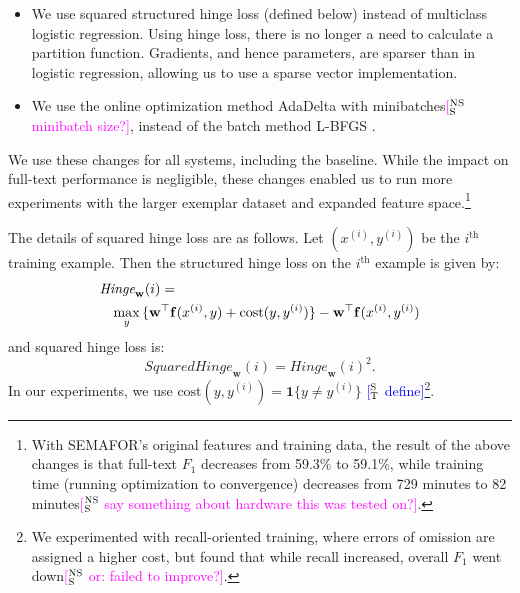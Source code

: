 \documentclass[11pt,a4paper]{article}
\newcommand{\indicator}[1]{\boldsymbol{1}\{#1\}}
\newcommand{\ensuretext}[1]{#1}
\newcommand{\nssmarker}{\ensuretext{\textcolor{magenta}{\ensuremath{^{\textsc{NS}}_{\textsc{S}}}}}}
\newcommand{\mkmarker}{\ensuretext{\textcolor{mdgreen}{\ensuremath{^{\textsc{M}}_{\textsc{K}}}}}}
\newcommand{\stmarker}{\ensuretext{\textcolor{blue}{\ensuremath{^{\textsc{S}}_{\textsc{T}}}}}}
\newcommand{\arkcomment}[3]{\ensuretext{\textcolor{#3}{[#1 #2]}}}
\newcommand{\nss}[1]{\arkcomment{\nssmarker}{#1}{magenta}}
\newcommand{\mk}[1]{\arkcomment{\mkmarker}{#1}{mdgreen}}
\newcommand{\st}[1]{\arkcomment{\stmarker}{#1}{blue}}
\begin{document}
\begin{itemize}
  \item We use squared structured hinge loss (defined below) instead of multiclass logistic regression.
  Using hinge loss, there is no longer a need to calculate a partition function.
  Gradients, and hence parameters, are sparser than in logistic regression, allowing us to use a sparse vector implementation.
  \item We use the online optimization method AdaDelta \citep{zeiler-12} with minibatches\nss{minibatch size?}, instead of the batch method L-BFGS \citep{liu-89}.
\end{itemize}
We use these changes for all systems, including the baseline.
While the impact on full-text performance is negligible, 
these changes enabled us to run more experiments with the larger exemplar dataset and expanded feature space.\footnote{With SEMAFOR's original features and training data, 
the result of the above changes is that full-text $F_1$ decreases from 59.3\% to 59.1\%, 
while training time (running optimization to convergence) 
decreases from 729 minutes to 82 minutes\nss{say something about hardware this was tested on?}.%
} 


The details of squared hinge loss are as follows.
Let $(x^{(i)}, y^{(i)})$ be the $i^{\text{th}}$ training example.
Then the structured hinge loss on the $i^{\text{th}}$ example is given by:
\begin{align*}
\lefteqn{\textit{Hinge}_\mathbf{w}(i) =} \\
&&\max_y{\{\mathbf{w}^\top \mathbf{f}(x^{(i)}, y) + \text{cost}(y, y^{(i)})\}} - \mathbf{w}^\top \mathbf{f}(x^{(i)}, y^{(i)})
\end{align*}
and squared hinge loss is:
\begin{equation}
\textit{SquaredHinge}_\mathbf{w}(i) =
\textit{Hinge}_\mathbf{w}(i)^2.
\end{equation}
In our experiments, we use $\text{cost}(y, y^{(i)}) = \indicator{y \ne y^{(i)}}$ \st{define}\footnote{We experimented with recall-oriented training, where errors of omission are assigned a higher cost, but found that while recall increased, overall $F_1$ went down\nss{or: failed to improve?}.}.
\end{document}

